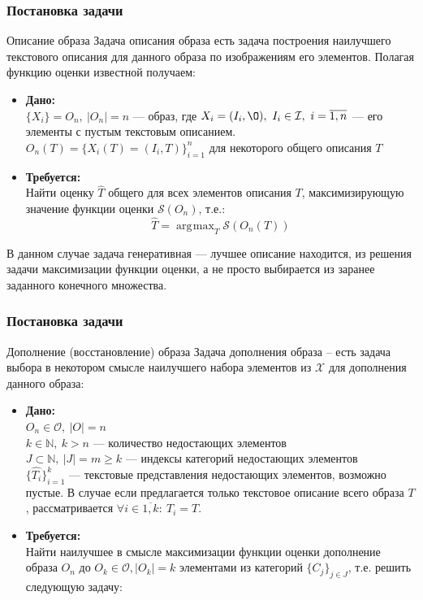 \documentclass[10pt]{beamer}
\DeclareMathOperator*{\argmax}{\arg\!\max}
\begin{document}
\begin{frame}
	\frametitle{Постановка задачи}
	\begin{block}{Описание образа}
		Задача описания образа есть задача построения наилучшего текстового описания для данного образа по изображениям его элементов. Полагая функцию оценки известной получаем:\\
		\begin{itemize}
			\item \textbf{Дано:}\\
			$\{X_i\} = O_n, ~|O_n| = n$ --- образ, где $X_i = (I_i, \O),~I_i\in\mathcal{I},~i=\overline{1, n}$ --- его элементы с пустым текстовым описанием. \\
			$O_n(T) = \{X_i(T) = (I_i, T)\}_{i=1}^n$ для некоторого общего описания $T$\\
			\item \textbf{Требуется:}\\
			Найти оценку $\hat{T}$ общего для всех элементов описания $T$, максимизирующую значение функции оценки $\mathcal{S}(O_n)$, т.е.: \\
			$$\hat{T}= \argmax_{T}\mathcal{S}(O_n(T))$$
		\end{itemize}
		В данном случае задача генеративная --- лучшее описание находится, из решения задачи максимизации функции оценки, а не просто выбирается из заранее заданного конечного множества.
	\end{block}					
\end{frame}


\begin{frame}
	\frametitle{Постановка задачи}
	\begin{block}{Дополнение (восстановление) образа}
		Задача дополнения образа -- есть задача выбора в некотором смысле наилучшего набора элементов из $\mathcal{X}$ для дополнения данного образа:
		\begin{itemize}
			\item \textbf{Дано:}\\
			$O_n\in\mathcal{O}, ~|O| = n$ \\
			$k \in \mathbb{N}, ~k> n$ --- количество недостающих элементов\\
			$J\subset\mathbb{N},~|J| = m\geqslant k$ --- индексы категорий недостающих элементов\\
			$\{\hat{T_i}\}_{i=1}^k$ --- текстовые представления недостающих элементов, возможно пустые. В случае если предлагается только текстовое описание всего образа $T$, рассматривается $\forall i \in \overline{1,k}: ~T_i = T$.
			
			\item \textbf{Требуется:}\\
			Найти наилучшее в смысле максимизации функции оценки дополнение образа $O_n$ до $O_k\in\mathcal{O}, |O_k|=k$ элементами из категорий $\{C_j\}_{j\in J}$, т.е. решить следующую задачу:
		\end{itemize}
	\end{block}					
\end{frame}
\end{document}
